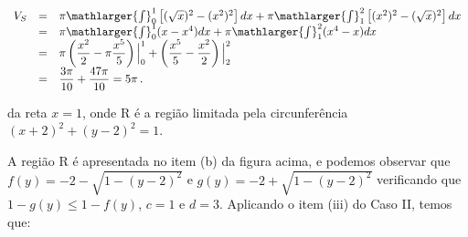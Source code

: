 \cleardoublepage\documentclass[../main.tex]{subfiles}
\begin{document}
\begin{ex}
\begin{compactenum}[a)]
\begin{solution}
\[ \begin{array}{rcl} V_S &=& \pi \mathlarger{\int}^{1}_{0}\left[ (\sqrt{x})^2 -(x^2)^2\right]dx + \pi \mathlarger{\int}^{2}_{1}\left[ (x^2)^2 - (\sqrt{x})^2 \right]dx\\ & =& \pi \mathlarger{\int}^{1}_{0} (x-x^4)dx + \pi \mathlarger{\int}^{2}_{1} (x^4 -x)dx \\ &=& \pi\left(\dfrac{x^2}{2}-\pi\dfrac{x^5}{5}\right)\Big{|}^{1}_{0} + \left(\dfrac{x^5}{5}-\dfrac{x^2}{2}\right)\Big{|}^{2}_{2} \\ &=& \dfrac{3\pi}{10}+ \dfrac{47\pi}{10}=5\pi\,. \end{array} \]
\end{solution}
\begin{figure}[htb]
\center
{}\qquad
{}
\label{fig:VolumeSolREv}
\end{figure}
\item da reta \(x=1\), onde R é a região limitada pela circunferência \((x+2)^2+(y-2)^2=1\).

\begin{solution}
A região R é apresentada no item (b) da figura acima, e podemos observar que \(f(y)= -2 -\sqrt{1-(y-2)^2}\) e \(g(y)= -2 +\sqrt{1-(y-2)^2}\) verificando que \(1-g(y) \leq 1-f(y)\), \(c=1\) e \(d=3\). Aplicando o item (iii) do Caso II, temos que:


\end{solution}
\end{compactenum}
\end{ex}
\end{document}
